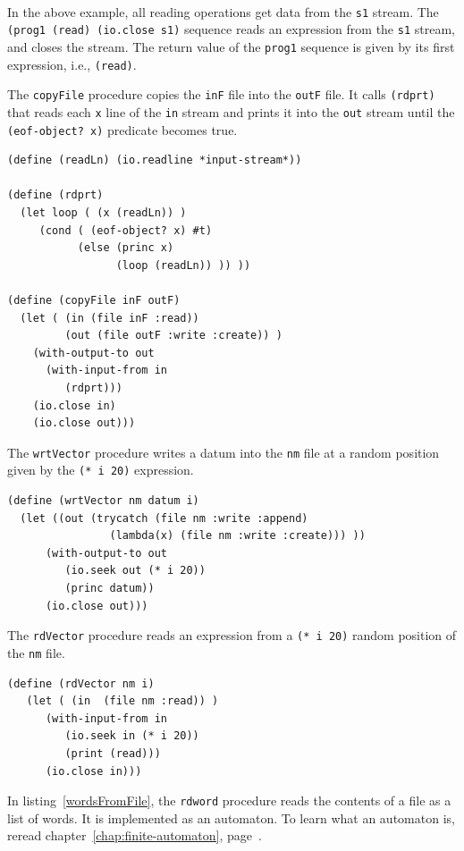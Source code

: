\documentclass[a4paper,12pt]{book}
\begin{document}
\verb||\\
In the above example, all reading
operations get data from the \verb|s1| stream.
The {\small \verb|(prog1 (read) (io.close s1)|}
sequence reads an expression from the \verb|s1|
stream, and closes the stream. The return
value of the \verb|prog1| sequence is given by its
first expression, i.e., \verb|(read)|.

The \verb|copyFile| procedure copies
the \verb|inF| file into the \verb|outF| file.
It calls \verb|(rdprt)| that reads
each \verb|x| line of the \verb|in| stream
and prints it into the \verb|out| stream
until the \verb|(eof-object? x)| predicate
becomes true.

\begin{verbatim}
(define (readLn) (io.readline *input-stream*))

(define (rdprt)
  (let loop ( (x (readLn)) )
     (cond ( (eof-object? x) #t)
           (else (princ x)
                 (loop (readLn)) )) ))

(define (copyFile inF outF)
  (let ( (in (file inF :read))
         (out (file outF :write :create)) )
    (with-output-to out
      (with-input-from in   
         (rdprt)))
    (io.close in)
    (io.close out)))
\end{verbatim}

The \verb|wrtVector| procedure writes a datum
into the \verb|nm| file at a
random position given by the \verb|(* i 20)|
expression.

\begin{verbatim}
(define (wrtVector nm datum i)
  (let ((out (trycatch (file nm :write :append)
                (lambda(x) (file nm :write :create))) ))
      (with-output-to out
         (io.seek out (* i 20))
         (princ datum))
      (io.close out)))
\end{verbatim}

The \verb|rdVector| procedure reads
an expression from a \verb|(* i 20)|
random position of the \verb|nm| file.

\begin{verbatim}
(define (rdVector nm i)
   (let ( (in  (file nm :read)) )
      (with-input-from in
         (io.seek in (* i 20))
         (print (read)))
      (io.close in)))
\end{verbatim}

In listing~\ref{wordsFromFile},
the \verb|rdword| procedure reads the
contents of a file as a list of words. 
It is implemented as an
automaton. To learn what an automaton is,
reread chapter~\ref{chap:finite-automaton},
page~\pageref{chap:finite-automaton}.
\end{document}
